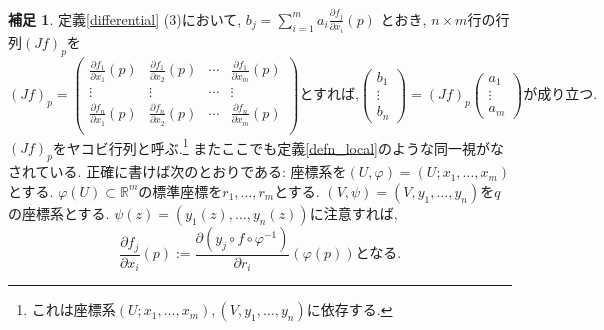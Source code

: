 \documentclass[dvipdfmx,a4paper,11pt]{article}
\newcommand{\R}{\mathbb{R}}
\theoremstyle{definition}
\newtheorem{rem}[thm]{補足}
\newcommand{\pdrv}[2]{\frac{\partial #1}{\partial #2}}
\begin{document}
    \begin{rem}
   定義\ref{differential} (3)において, $b_j = \sum_{i=1}^{m} a_i  \pdrv{f_{j}}{x_i}(p) $ とおき, $n \times m$行の行列$(Jf)_{p}$を
   $$
   (Jf)_{p} = 
   \begin{pmatrix}
   \pdrv{f_{1}}{x_1}(p) & \pdrv{f_{1}}{x_2}(p)  & \cdots & \pdrv{f_{1}}{x_m}(p) \\
   \vdots& \vdots& \cdots & \vdots \\
   \pdrv{f_{n}}{x_1}(p) & \pdrv{f_{n}}{x_2}(p)  & \cdots & \pdrv{f_{n}}{x_m}(p) \\
   \end{pmatrix}
   \text{とすれば,} 
   \begin{pmatrix}
   b_1 \\ \vdots \\ b_n 
   \end{pmatrix}
   =
   (Jf)_{p} 
   \begin{pmatrix}
   a_1 \\ \vdots \\ a_m
   \end{pmatrix}
      \text{が成り立つ.} 
   $$
 $(Jf)_{p} $をヤコビ行列と呼ぶ.\footnote{これは座標系$(U; x_1, \ldots, x_m),(V, y_1, \ldots, y_n)$に依存する. } 
またここでも定義\ref{defn_local}のような同一視がなされている. 正確に書けば次のとおりである:
座標系を$(U, \varphi)=(U; x_1, \ldots, x_m)$とする. $\varphi(U) \subset \R^{m}$の標準座標を$r_1, \ldots, r_m$とする. 
$(V, \psi) = (V, y_1, \ldots, y_n)$を$q$の座標系とする. $\psi(z) = (y_1(z), \ldots, y_n(z))$に注意すれば, 
       $$
        \pdrv{f_j}{x_i}(p) := \pdrv{ (y_j \circ f  \circ \varphi^{-1})}{r_i}( \varphi(p) )  \text{となる.}
       $$
    \end{rem}



\end{document}
